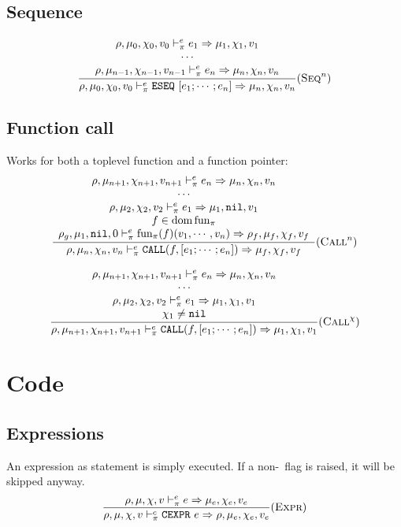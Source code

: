 \subsection{Sequence}
\[\dfrac{\begin{array}{c}
    \rho,\mu_0,\chi_0,v_0 \vdash_\pi^e e_1 \Rightarrow \mu_1,\chi_1,v_1 \\
    \cdots \\
    \rho,\mu_{n-1},\chi_{n-1},v_{n-1} \vdash_\pi^e e_n \Rightarrow \mu_n,\chi_n,v_n \\
\end{array}}{\rho,\mu_0,\chi_0,v_0 \vdash_\pi^e \texttt{ESEQ}\ [e_1;\cdots;e_n] \Rightarrow \mu_n,\chi_n,v_n} (\textsc{Seq}^n)\]

\subsection{Function call}
Works for both a toplevel function and a function pointer:
\[\dfrac{\begin{array}{c}
    \rho,\mu_{n+1},\chi_{n+1},v_{n+1} \vdash_\pi^e e_n \Rightarrow \mu_n,\chi_n,v_n \\
    \cdots \\
    \rho,\mu_2,\chi_2,v_2 \vdash_\pi^e e_1 \Rightarrow \mu_1,\texttt{nil},v_1 \\
    f\in\operatorname{dom}\text{fun}_\pi \\
    \rho_g,\mu_1,\texttt{nil},0 \vdash_\pi^e \text{fun}_\pi(f)(v_1, \cdots, v_n) \Rightarrow \rho_f,\mu_f,\chi_f,v_f
\end{array}}{\rho,\mu_n,\chi_n,v_n \vdash_\pi^e \texttt{CALL}(f, [e_1; \cdots; e_n]) \Rightarrow \mu_f,\chi_f,v_f} (\textsc{Call}^n)\]

\[\dfrac{\begin{array}{c}
    \rho,\mu_{n+1},\chi_{n+1},v_{n+1} \vdash_\pi^e e_n \Rightarrow \mu_n,\chi_n,v_n \\
    \cdots \\
    \rho,\mu_2,\chi_2,v_2 \vdash_\pi^e e_1 \Rightarrow \mu_1,\chi_1,v_1 \\
    \chi_1\ne\texttt{nil} \\
\end{array}}{\rho,\mu_{n+1},\chi_{n+1},v_{n+1} \vdash_\pi^e \texttt{CALL}(f, [e_1; \cdots; e_n]) \Rightarrow \mu_1,\chi_1,v_1} (\textsc{Call}^\chi)\]


\section{Code}
\subsection{Expressions}
An expression as statement is simply executed. If a non-\nil\ flag is raised, it will be skipped anyway.\\
\[\dfrac{
    \rho,\mu,\chi,v \vdash_\pi^e e \Rightarrow \mu_e,\chi_e,v_e
}{\rho,\mu,\chi,v \vdash_\pi^c \texttt{CEXPR}\ e \Rightarrow \rho,\mu_e,\chi_e,v_e}(\textsc{Expr})\]

